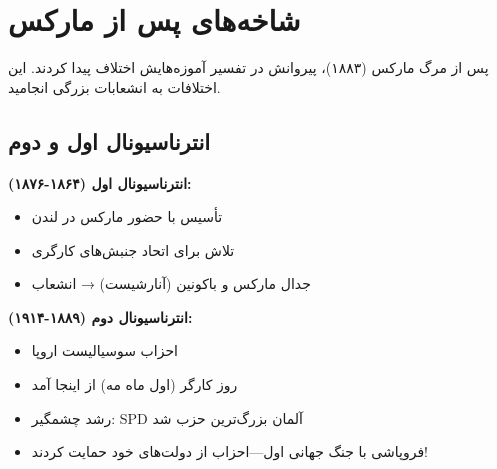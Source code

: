 \section{شاخه‌های پس از مارکس}

پس از مرگ مارکس (۱۸۸۳)، پیروانش در تفسیر آموزه‌هایش اختلاف پیدا کردند. این اختلافات به انشعابات بزرگی انجامید.

\subsection{انترناسیونال اول و دوم}

\begin{historybox}[انترناسیونال‌ها]
\textbf{انترناسیونال اول (۱۸۶۴-۱۸۷۶):}
\begin{itemize}[nosep]
    \item تأسیس با حضور مارکس در لندن
    \item تلاش برای اتحاد جنبش‌های کارگری
    \item جدال مارکس و باکونین (آنارشیست) → انشعاب
\end{itemize}

\textbf{انترناسیونال دوم (۱۸۸۹-۱۹۱۴):}
\begin{itemize}[nosep]
    \item احزاب سوسیالیست اروپا
    \item روز کارگر (اول ماه مه) از اینجا آمد
    \item رشد چشمگیر: SPD آلمان بزرگ‌ترین حزب شد
    \item فروپاشی با جنگ جهانی اول—احزاب از دولت‌های خود حمایت کردند!
\end{itemize}
\end{historybox}

